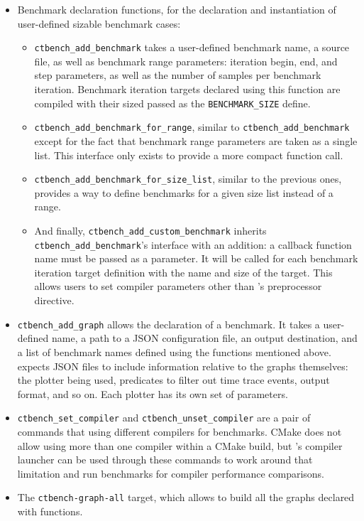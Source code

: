 \documentclass[../main]{subfiles}
\begin{document}
\begin{itemize}

\item Benchmark declaration functions, for the declaration and instantiation
of user-defined sizable benchmark cases:

  \begin{itemize}

  \item
  \lstinline{ctbench_add_benchmark} takes a user-defined benchmark name,
  a \cpp source file, as well as benchmark range parameters: iteration begin,
  end, and step parameters, as well as the number of samples per benchmark
  iteration. Benchmark iteration targets declared using this function are
  compiled with their sized passed as the \lstinline{BENCHMARK_SIZE} define.

  \item
  \lstinline{ctbench_add_benchmark_for_range}, similar to
  \lstinline{ctbench_add_benchmark} except for the fact that benchmark range
  parameters are taken as a single list. This interface only exists to provide
  a more compact function call.

  \item
  \lstinline{ctbench_add_benchmark_for_size_list}, similar to the previous ones,
  provides a way to define benchmarks for a given size list instead of a range.

  \item
  And finally, \lstinline{ctbench_add_custom_benchmark} inherits
  \lstinline{ctbench_add_benchmark}'s interface with an addition:
  a callback function name must be passed as a parameter. It will be called
  for each benchmark iteration target definition with the name and size of the
  target. This allows users to set compiler parameters other than \ctbench's
  preprocessor directive.

  \end{itemize}

\item
\lstinline{ctbench_add_graph} allows the declaration of a benchmark.
It takes a user-defined name, a path to a JSON configuration file,
an output destination, and a list of benchmark names defined using the
functions mentioned above. \ctbench expects JSON files to include information
relative to the graphs themselves: the plotter being used, predicates
to filter out time trace events, output format, and so on.
Each plotter has its own set of parameters.

\item
\lstinline{ctbench_set_compiler} and \lstinline{ctbench_unset_compiler}
are a pair of commands that using different compilers for benchmarks.
CMake does not allow using more than one compiler within a CMake build,
but \ctbench's compiler launcher can be used through these commands
to work around that limitation and run benchmarks for compiler performance
comparisons.

\item
The \lstinline{ctbench-graph-all} target, which allows to build all the graphs
declared with \ctbench functions.

\end{itemize}
\end{document}
